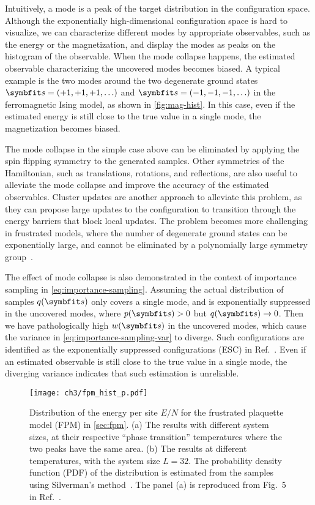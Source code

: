 Intuitively, a mode is a peak of the target distribution in the configuration space. Although the exponentially high-dimensional configuration space is hard to visualize, we can characterize different modes by appropriate observables, such as the energy or the magnetization, and display the modes as peaks on the histogram of the observable. When the mode collapse happens, the estimated observable characterizing the uncovered modes becomes biased. A typical example is the two modes around the two degenerate ground states $\vs = (+1, +1, +1, \ldots)$ and $\vs = (-1, -1, -1, \ldots)$ in the ferromagnetic Ising model, as shown in \cref{fig:mag-hist}. In this case, even if the estimated energy is still close to the true value in a single mode, the magnetization becomes biased.

The mode collapse in the simple case above can be eliminated by applying the spin flipping symmetry to the generated samples. Other symmetries of the Hamiltonian, such as translations, rotations, and reflections, are also useful to alleviate the mode collapse and improve the accuracy of the estimated observables. Cluster updates are another approach to alleviate this problem, as they can propose large updates to the configuration to transition through the energy barriers that block local updates. The problem becomes more challenging in frustrated models, where the number of degenerate ground states can be exponentially large, and cannot be eliminated by a polynomially large symmetry group~\cite{wannier1950antiferromagnetism, mambrini1999residual, vanderstraeten2018residual}.

The effect of mode collapse is also demonstrated in the context of importance sampling in \cref{eq:importance-sampling}. Assuming the actual distribution of samples $q(\vs)$ only covers a single mode, and is exponentially suppressed in the uncovered modes, where $p(\vs) > 0$ but $q(\vs) \to 0$. Then we have pathologically high $w(\vs)$ in the uncovered modes, which cause the variance in \cref{eq:importance-sampling-var} to diverge. Such configurations are identified as the exponentially suppressed configurations (ESC) in Ref.~\cite{wu2021unbiased}. Even if an estimated observable is still close to the true value in a single mode, the diverging variance indicates that such estimation is unreliable.

\begin{figure}[htb]
\centering
\texttt{[image: ch3/fpm\_hist\_p.pdf]}
\caption[Distribution of energy for FPM with different sizes and temperatures]{
Distribution of the energy per site $E / N$ for the frustrated plaquette model (FPM) in \cref{sec:fpm}.
(a) The results with different system sizes, at their respective ``phase transition'' temperatures where the two peaks have the same area.
(b) The results at different temperatures, with the system size $L = 32$.
The probability density function (PDF) of the distribution is estimated from the samples using Silverman’s method~\cite{silverman1986density}.
The panel (a) is reproduced from Fig.~5 in Ref.~\cite{wu2021unbiased}.
}
\label{fig:fpm-hist-p}
\end{figure}

